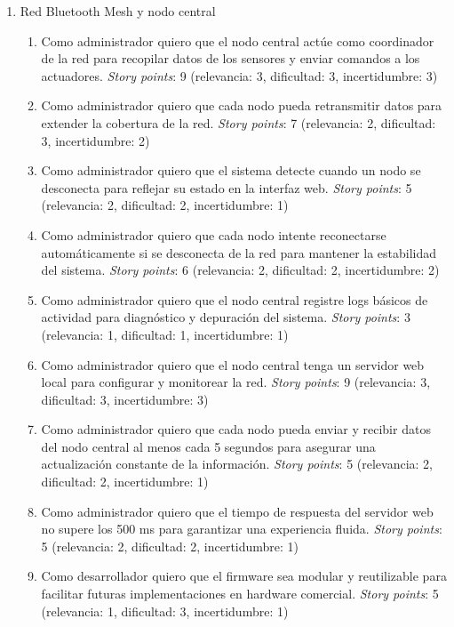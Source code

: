\documentclass[
11pt, %
]{charter}
\begin{document}
\begin{enumerate}
\item Red Bluetooth Mesh y nodo central
\begin{enumerate}
	\item Como administrador quiero que el nodo central actúe como coordinador de la red para recopilar datos de los sensores y enviar comandos a los actuadores. \textit{Story points}: 9 (relevancia: 3, dificultad: 3, incertidumbre: 3)

	\item Como administrador quiero que cada nodo pueda retransmitir datos para extender la cobertura de la red. \textit{Story points}: 7 (relevancia: 2, dificultad: 3, incertidumbre: 2)

	\item Como administrador quiero que el sistema detecte cuando un nodo se desconecta para reflejar su estado en la interfaz web. \textit{Story points}: 5 (relevancia: 2, dificultad: 2, incertidumbre: 1)

	\item Como administrador quiero que cada nodo intente reconectarse automáticamente si se desconecta de la red para mantener la estabilidad del sistema. \textit{Story points}: 6 (relevancia: 2, dificultad: 2, incertidumbre: 2)

	\item Como administrador quiero que el nodo central registre logs básicos de actividad para diagnóstico y depuración del sistema. \textit{Story points}: 3 (relevancia: 1, dificultad: 1, incertidumbre: 1)

	\item Como administrador quiero que el nodo central tenga un servidor web local para configurar y monitorear la red. \textit{Story points}: 9 (relevancia: 3, dificultad: 3, incertidumbre: 3)

	\item Como administrador quiero que cada nodo pueda enviar y recibir datos del nodo central al menos cada 5 segundos para asegurar una actualización constante de la información. \textit{Story points}: 5 (relevancia: 2, dificultad: 2, incertidumbre: 1)

	\item Como administrador quiero que el tiempo de respuesta del servidor web no supere los 500 ms para garantizar una experiencia fluida. \textit{Story points}: 5 (relevancia: 2, dificultad: 2, incertidumbre: 1)

	\item Como desarrollador quiero que el firmware sea modular y reutilizable para facilitar futuras implementaciones en hardware comercial. \textit{Story points}: 5 (relevancia: 1, dificultad: 3, incertidumbre: 1)
\end{enumerate}



\end{enumerate}
\end{document}
